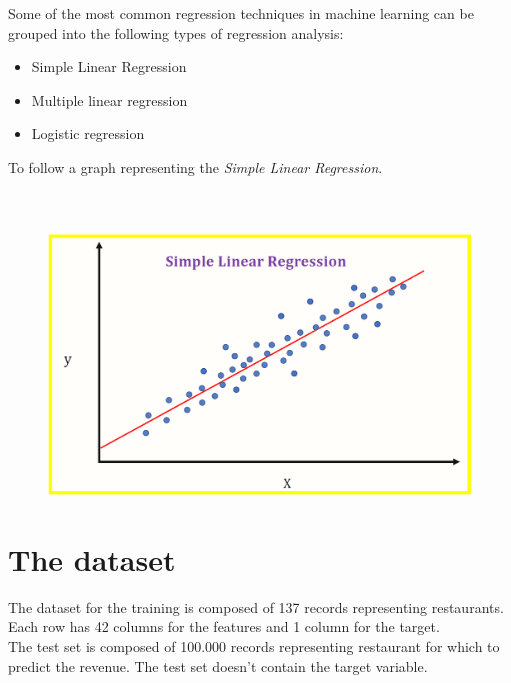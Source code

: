 \documentclass[a4paper,10pt]{report}
\begin{document}
Some of the most common regression techniques in machine learning can be grouped into the following types of regression analysis: 
\begin{itemize}
\item Simple Linear Regression 
\item Multiple linear regression 
\item Logistic regression 
\end{itemize}
To follow a graph representing the \emph{Simple Linear Regression}.
\\
\\
\\
\begin{figure}[H]
    \includegraphics[width = 400pt]{img/simplelinregr.png}
  \end{figure} 
\chapter{The dataset}
The dataset for the training is composed of 137 records representing restaurants.\\
Each row has 42 columns for the features and 1 column for the target.\\
The test set is composed of 100.000 records representing restaurant for which to predict the revenue. The test set doesn't contain the target variable.\\
\end{document}
